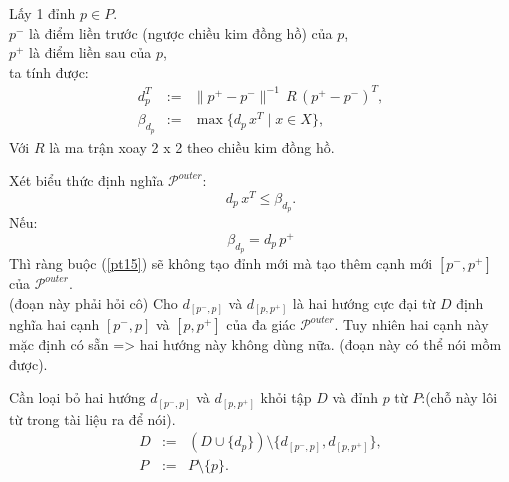 \documentclass[11pt]{beamer}
\theoremstyle{definition}
\theoremstyle{plain}
\theoremstyle{plain}
\theoremstyle{remark}
\begin{document}
	\begin{frame}
		Lấy 1 đỉnh $p \in P$.\\
		 $p^{-}$ là điểm liền trước (ngược chiều kim đồng hồ) của $p$,\\
		 $p^{+}$ là điểm liền sau của $p$,\\
		 ta tính được:\\
		\begin{equation}\label{def_d_p}
			\begin{array}{lcl}
				d_{p}^T &:=& \|p^+ - p^-\|^{-1}\, R \, (p^+ - p^-)^T, \\
				\beta_{d_{p}} &:=& \max\{d_{p}\, x^T \mid x \in X\},
			\end{array}
		\end{equation}
		Với $R$ là ma trận xoay 2 x 2 theo chiều kim đồng hồ.

	\end{frame}
	\begin{frame}
		Xét biểu thức định nghĩa $\mathcal{P}^{outer}$:
		\begin{equation}\label{pt15}
			d_p\, x^T \leq \beta_{d_p}.
		\end{equation}
		Nếu:
		\begin{equation}
			\label{betaequal}
			\beta_{d_p} = d_p\, p^+
		\end{equation}
		Thì ràng buộc (\ref{pt15}) sẽ không tạo đỉnh mới mà tạo thêm cạnh mới $[p^-, p^+]$ của $\mathcal{P}^{outer}$.\\ (đoạn này phải hỏi cô)
		Cho $d_{[p^-, p]}$ và $d_{[p, p^+]}$ là hai hướng cực đại từ $D$ định nghĩa hai cạnh $[p^-, p]$ và $[p, p^+]$ của đa giác $\mathcal{P}^{outer}$. Tuy nhiên hai cạnh này mặc định có sẵn => hai hướng này không dùng nữa. (đoạn này có thể nói mồm được).
		
	\end{frame}
	
	\begin{frame}
		Cần loại bỏ hai hướng $d_{[p^-, p]}$ và $d_{[p, p^+]}$ khỏi tập $D$ và đỉnh $p$ từ $P$:(chỗ này lôi từ trong tài liệu ra để nói).
		\begin{equation}\label{newDP2}
			\begin{array}{lcl}
				D &:=& (D \cup \{d_{p}\})\setminus \{d_{[p^-,p]}, d_{[p,p^+]}\}, \\
				P &:=& P \setminus \{p\}.
			\end{array}
		\end{equation}
	\end{frame}
	
\end{document}
